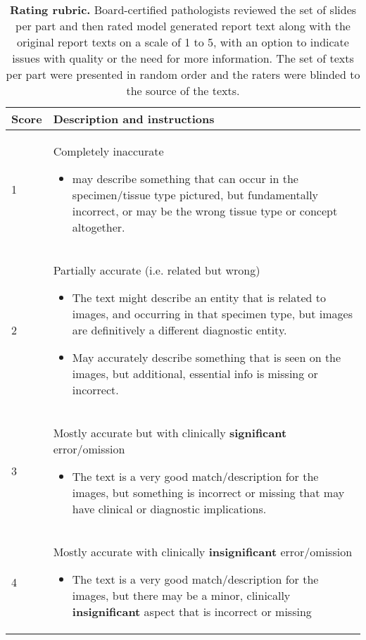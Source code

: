 \documentclass[11pt]{article}
\begin{document}
\begin{table}[h]
\small
\caption{\small \textbf{Rating rubric.} Board-certified pathologists reviewed the set of slides per part and then rated model generated report text along with the original report texts on a scale of 1 to 5, with an option to indicate issues with quality or the need for more information. The set of texts per part were presented in random order and the raters were blinded to the source of the texts.}
\centering
\begin{tabular}{m{1.5cm} p{14cm}}
\toprule
\textbf{Score} & \textbf{Description and instructions} \\
\midrule
1 & Completely inaccurate
\begin{itemize}
\setlength{\itemsep}{0pt}
    \item may describe something that can occur in the specimen/tissue type pictured, but fundamentally incorrect, or may be the wrong tissue type or concept altogether.
\end{itemize} \\
\hline
2 & Partially accurate (i.e. related but wrong)
\begin{itemize}
\setlength{\itemsep}{0pt}
    \item The text might describe an entity that is related to images, and occurring in that specimen type, but images are definitively a different diagnostic entity.
    \item May accurately describe something that is seen on the images, but additional, essential info is missing or incorrect.
\end{itemize} \\
\hline
3 & Mostly accurate but with clinically \textbf{significant} error/omission
\begin{itemize}
\setlength{\itemsep}{0pt}
    \item The text is a very good match/description for the images, but something is incorrect or missing that may have clinical or diagnostic implications.
\end{itemize} \\
\hline
4 & Mostly accurate with clinically \textbf{insignificant} error/omission
\begin{itemize}
    \item The text is a very good match/description for the images, but there may be a minor, clinically \textbf{insignificant} aspect that is incorrect or missing
\end{itemize} \\

\end{tabular}
\end{table}
\end{document}
